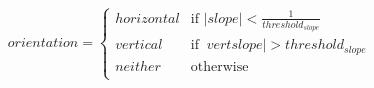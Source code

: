 \documentclass{paper}
\begin{document}
\begin{equation}
orientation =
\begin{cases}
horizontal & \text{if } \lvert slope \rvert < \frac{1}{threshold_{slope}} \\
vertical & \text{if } \ vert slope \rvert > threshold_{slope} \\
neither & \text{otherwise}\\
\end{cases}
\label{eq:slopethresh}
\end{equation}
\end{document}
